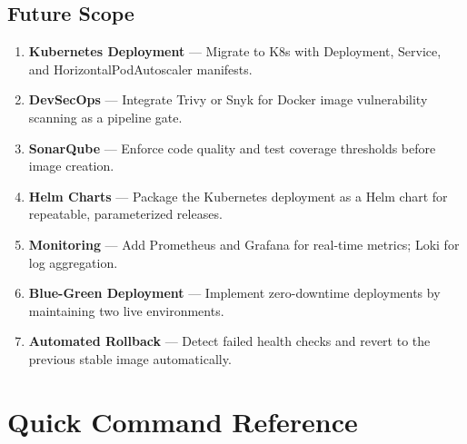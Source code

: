 \documentclass[12pt,a4paper]{report}
\begin{document}
\section{Future Scope}

\begin{enumerate}[leftmargin=*, label=\arabic*.]
  \item \textbf{Kubernetes Deployment} — Migrate to K8s with Deployment, Service, and HorizontalPodAutoscaler manifests.
  \item \textbf{DevSecOps} — Integrate Trivy or Snyk for Docker image vulnerability scanning as a pipeline gate.
  \item \textbf{SonarQube} — Enforce code quality and test coverage thresholds before image creation.
  \item \textbf{Helm Charts} — Package the Kubernetes deployment as a Helm chart for repeatable, parameterized releases.
  \item \textbf{Monitoring} — Add Prometheus and Grafana for real-time metrics; Loki for log aggregation.
  \item \textbf{Blue-Green Deployment} — Implement zero-downtime deployments by maintaining two live environments.
  \item \textbf{Automated Rollback} — Detect failed health checks and revert to the previous stable image automatically.
\end{enumerate}


\appendix
\chapter{Quick Command Reference}
\end{document}
